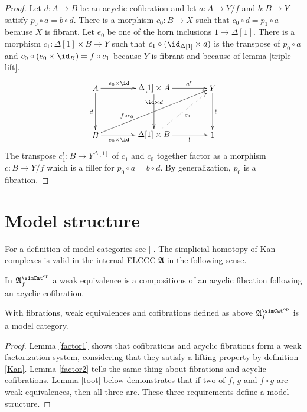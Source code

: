 \documentclass{tac}
\newcommand\dual{^{\mathrm{op}}}
\newcommand\s{^{\simCat\dual}}
\newcommand\bang{!}
\newcommand\of{:}
\newcommand\simplex\Delta
\newcommand\f{_f}
\newcommand\ambient{\mathfrak A}
\begin{document}
\begin{proof}
Let $d\of A\to B$ be an acyclic cofibration and let $a\of A\to Y/f$ and $b\of B\to Y$ satisfy $p_0\circ a = b\circ d$. There is a morphism $c_0\of B\to X$ such that $c_0\circ d = p_1\circ a$ because $X$ is fibrant. Let $e_0$ be one of the horn inclusions $1\to \simplex[1]$. There is a morphism $c_1\of\simplex[1]\times B\to Y$ such that $c_1\circ{(\id_{\simplex[1]}\times d)}$ is the transpose of $p_0\circ a$ and $c_0\circ (e_0\times \id_B) = f\circ c_1$ because $Y$ is fibrant and because of lemma \ref{triple lift}.
\[\xy
(0,20)*+{A}="AC",(25,20)*+{\simplex[1]\times A}="BC",(50,20)*+{Y}="Y",
(0,0)*+{B}="AD",(25,0)*+{\simplex[1]\times B}="BD",(50,0)*+{1}="one"
\ar^(.4){e_0\times\id} "AC";"BC"
\ar_{d} "AC";"AD"
\ar_(.4){e_0\times\id} "AD";"BD"
\ar^(.3){f\circ c_0} "AD";"Y"
\ar|(.3){\id\times d} "BC";"BD"
\ar^(.6){a^t} "BC";"Y"
\ar@{.>}_{c_1} "BD";"Y"
\ar_(.6){\bang} "BD";"one"
\ar^{\bang} "Y";"one"
\endxy\]
The transpose $c_1^t\of B\to Y^{\simplex[1]}$ of $c_1$ and $c_0$ together factor as a morphism $c\of B \to Y/f$ which is a filler for $p_0\circ a = b\circ d$. By generalization, $p_0$ is a fibration.
\end{proof}



\section{Model structure}
For a definition of model categories see [\cite{Hovey99, GJSHT}]. The simplicial homotopy of Kan complexes is valid in the internal ELCCC $\ambient$ in the following sense.%

\begin{definition} In $\ambient\s\f$ a weak equivalence is a compositions of an acyclic fibration following an acyclic cofibration. \end{definition}


\begin{theorem}
With fibrations, weak equivalences and cofibrations defined as above $\ambient\s\f$ is a model category.
\label{model category}
\end{theorem}

\begin{proof}
Lemma \ref{factor1} shows that cofibrations and acyclic fibrations form a weak factorization system, considering that they satisfy a lifting property by definition \ref{Kan}. Lemma \ref{factor2} tells the same thing about fibrations and acyclic cofibrations. Lemma \ref{toot} below demonstrates that if two of $f$, $g$ and $f\circ g$ are weak equivalences, then all three are. These three requirements define a model structure.
\end{proof}
\end{document}
